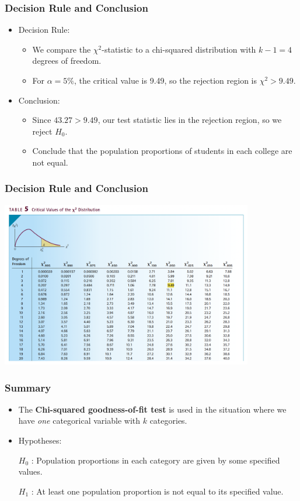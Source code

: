 \documentclass[12pt]{beamer}
\begin{document}
		\begin{frame}
			\frametitle{Decision Rule and Conclusion}
			
			\begin{itemize}[label={\color{blue}$\blacktriangleright$}]
				\item Decision Rule:
				\begin{itemize}[label={\color{blue}$\blacktriangleright$}]
					\item We compare the $\chi^2$-statistic to a chi-squared distribution with $k-1=4$ degrees of freedom.
					\item For $\alpha = 5\%$, the critical value is 9.49, so the rejection region is $\chi^2 > 9.49$.
				\end{itemize}
				
				\item Conclusion:
				\begin{itemize}[label={\color{blue}$\blacktriangleright$}]
					\item Since $43.27 > 9.49$, our test statistic lies in the rejection region, so we reject $H_0$.
					\item Conclude that the population proportions of students in each college are not equal.
				\end{itemize}
			\end{itemize}
			
		\end{frame}
				\begin{frame}
			\frametitle{Decision Rule and Conclusion}
			\centering
\includegraphics[width=11cm]{chitable.png}
			
		\end{frame}
		\begin{frame}
			\frametitle{Summary}
			
			\begin{itemize}[label={\color{blue}$\blacktriangleright$}]
				\item The \textbf{Chi-squared goodness-of-fit test} is used in the situation where we have \emph{one} categorical variable with $k$ categories.
				
				\item Hypotheses:
				
				\medskip
				$H_0$ : Population proportions in each category are given by some specified values.
				
				\medskip
				$H_1$ : At least one population proportion is not equal to its specified value.
			\end{itemize}
			
		\end{frame}
\end{document}
